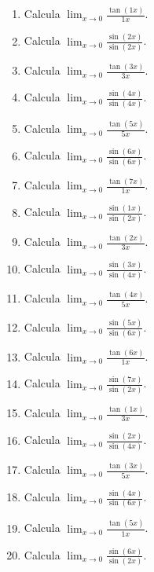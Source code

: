 \documentclass[11pt,a4paper]{article}
\begin{document}
\begin{enumerate}[label=\textbf{E\arabic*.},start=421]

\item Calcula $\displaystyle\lim_{x\to0}\frac{\tan(1x)}{1x}$.

\item Calcula $\displaystyle\lim_{x\to0}\frac{\sin(2x)}{\sin(2x)}$.

\item Calcula $\displaystyle\lim_{x\to0}\frac{\tan(3x)}{3x}$.

\item Calcula $\displaystyle\lim_{x\to0}\frac{\sin(4x)}{\sin(4x)}$.

\item Calcula $\displaystyle\lim_{x\to0}\frac{\tan(5x)}{5x}$.

\item Calcula $\displaystyle\lim_{x\to0}\frac{\sin(6x)}{\sin(6x)}$.

\item Calcula $\displaystyle\lim_{x\to0}\frac{\tan(7x)}{1x}$.

\item Calcula $\displaystyle\lim_{x\to0}\frac{\sin(1x)}{\sin(2x)}$.

\item Calcula $\displaystyle\lim_{x\to0}\frac{\tan(2x)}{3x}$.

\item Calcula $\displaystyle\lim_{x\to0}\frac{\sin(3x)}{\sin(4x)}$.

\item Calcula $\displaystyle\lim_{x\to0}\frac{\tan(4x)}{5x}$.

\item Calcula $\displaystyle\lim_{x\to0}\frac{\sin(5x)}{\sin(6x)}$.

\item Calcula $\displaystyle\lim_{x\to0}\frac{\tan(6x)}{1x}$.

\item Calcula $\displaystyle\lim_{x\to0}\frac{\sin(7x)}{\sin(2x)}$.

\item Calcula $\displaystyle\lim_{x\to0}\frac{\tan(1x)}{3x}$.

\item Calcula $\displaystyle\lim_{x\to0}\frac{\sin(2x)}{\sin(4x)}$.

\item Calcula $\displaystyle\lim_{x\to0}\frac{\tan(3x)}{5x}$.

\item Calcula $\displaystyle\lim_{x\to0}\frac{\sin(4x)}{\sin(6x)}$.

\item Calcula $\displaystyle\lim_{x\to0}\frac{\tan(5x)}{1x}$.

\item Calcula $\displaystyle\lim_{x\to0}\frac{\sin(6x)}{\sin(2x)}$.

\end{enumerate}
\end{document}
